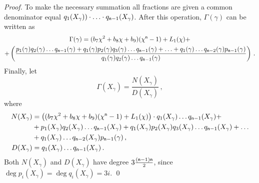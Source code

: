 \documentclass[runningheads]{llncs}
\theoremstyle{definition}
\begin{document}
\begin{proof}
To make the necessary summation all fractions are given a common denominator equal $q_1 (X_\gamma)) \cdot \ldots \cdot q_{\mathsf{n} - 1} (X_\gamma)$. After this operation, $\Gamma(\gamma)$ can be written as
\begin{multline}
  \Gamma(\gamma) = (b_7 \chi^2 + b_8 \chi + b_9) (\chi^{\mathsf{n}} - 1) + L_1 (\chi) + \\
   + \left(\frac{
   p_1(\gamma) q_2(\gamma) \ldots q_{\mathsf{n} - 1}(\gamma) + q_1(\gamma) p_2(\gamma) q_3(\gamma) \ldots q_{\mathsf{n} - 1}(\gamma) + \ldots + q_1(\gamma) \ldots q_{\mathsf{n} - 2}(\gamma) p_{\mathsf{n} - 1}(\gamma)
   }{
   q_1(\gamma) q_2(\gamma) \ldots q_{\mathsf{n} - 1}(\gamma)
   }
  \right)\,.
\end{multline}
Finally, let 
\[
  \Gamma (X_\gamma) = \frac{N(X_\gamma)}{D(X_\gamma)}\,,
\]
where 
\begin{align*}
  N(X_\gamma) & = \left((b_7 \chi^2 + b_8 \chi + b_9) (\chi^{\mathsf{n}} - 1) + L_1 (\chi)\right) \cdot q_1(X_\gamma) \ldots q_{\mathsf{n} - 1}(X_\gamma) + \\
   & + p_1(X_\gamma) q_2(X_\gamma) \ldots q_{\mathsf{n} - 1}(X_\gamma) + q_1(X_\gamma) p_2(X_\gamma) q_3(X_\gamma) \ldots q_{\mathsf{n} - 1}(X_\gamma) + \ldots \\
   & + q_1(X_\gamma) \ldots q_{\mathsf{n} - 2}(X_\gamma) p_{\mathsf{n} - 1}(\gamma)\,,\\
  D(X_\gamma) & = q_1(X_\gamma)  \ldots q_{\mathsf{n} - 1}(X_\gamma)\,.
\end{align*} 
Both $N(X_\gamma)$ and $D(X_\gamma)$ have degree $3 \frac{(\mathsf{n} - 1) \mathsf{n}}{2}$, since $\deg p_i (X_\gamma) \allowbreak = \deg q_i (X_\gamma) = 3 i$.
\qed
\end{proof}



\end{document}
